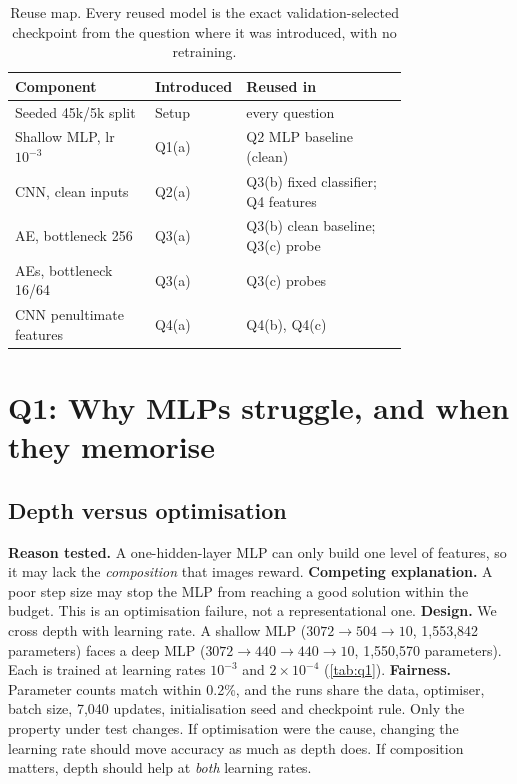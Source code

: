 \documentclass[10pt,twocolumn,letterpaper]{article}
\begin{document}
\begin{table}[t]
\centering\footnotesize
\setlength{\tabcolsep}{3pt}
\begin{tabular}{@{}p{0.36\linewidth}lp{0.42\linewidth}@{}}
\toprule
Component & Introduced & Reused in\\
\midrule
Seeded 45k/5k split & Setup & every question\\
Shallow MLP, lr $10^{-3}$ & Q1(a) & Q2 MLP baseline (clean)\\
CNN, clean inputs & Q2(a) & Q3(b) fixed classifier; Q4 features\\
AE, bottleneck 256 & Q3(a) & Q3(b) clean baseline; Q3(c) probe\\
AEs, bottleneck 16/64 & Q3(a) & Q3(c) probes\\
CNN penultimate features & Q4(a) & Q4(b), Q4(c)\\
\bottomrule
\end{tabular}
\caption{Reuse map. Every reused model is the exact validation-selected checkpoint from the question where it was introduced, with no retraining.}
\label{tab:reuse}
\end{table}

\section{Q1: Why MLPs struggle, and when they memorise}
\subsection{Depth versus optimisation}
\textbf{Reason tested.} A one-hidden-layer MLP can only build one level of features, so it may lack the \emph{composition} that images reward.
\textbf{Competing explanation.} A poor step size may stop the MLP from reaching a good solution within the budget. This is an optimisation failure, not a representational one.
\textbf{Design.} We cross depth with learning rate.
A shallow MLP ($3072{\to}504{\to}10$, 1,553,842 parameters) faces a deep MLP ($3072{\to}440{\to}440{\to}10$, 1,550,570 parameters).
Each is trained at learning rates $10^{-3}$ and $2{\times}10^{-4}$ (\cref{tab:q1}).
\textbf{Fairness.} Parameter counts match within 0.2\%, and the runs share the data, optimiser, batch size, 7,040 updates, initialisation seed and checkpoint rule.
Only the property under test changes.
If optimisation were the cause, changing the learning rate should move accuracy as much as depth does.
If composition matters, depth should help at \emph{both} learning rates.
\end{document}
